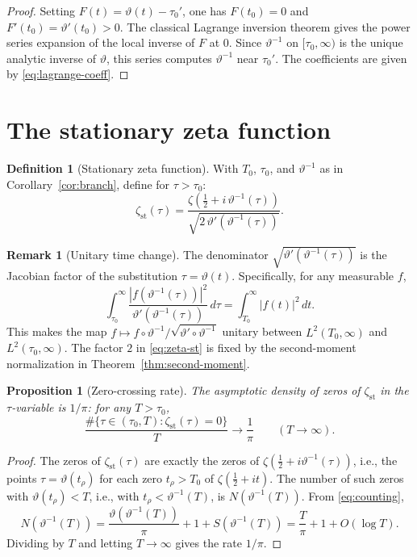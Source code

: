 \documentclass[11pt]{article}
\numberwithin{equation}{section}
\theoremstyle{plain}
\newtheorem{proposition}[theorem]{Proposition}
\theoremstyle{definition}
\newtheorem{definition}[theorem]{Definition}
\newtheorem{remark}[theorem]{Remark}
\begin{document}
\begin{proof}
Setting \(F(t)=\vartheta(t)-\tau_0'\), one has \(F(t_0)=0\) and
\(F'(t_0)=\vartheta'(t_0)>0\). The classical Lagrange inversion theorem gives the
power series expansion of the local inverse of \(F\) at \(0\). Since
\(\vartheta^{-1}\) on \([\tau_0,\infty)\) is the unique analytic inverse of \(\vartheta\),
this series computes \(\vartheta^{-1}\) near \(\tau_0'\). The coefficients are given
by \eqref{eq:lagrange-coeff}.
\end{proof}

\section{The stationary zeta function}

\begin{definition}[Stationary zeta function]
\label{def:zeta-st}
With \(T_0\), \(\tau_0\), and \(\vartheta^{-1}\) as in Corollary~\ref{cor:branch},
define for \(\tau>\tau_0\):
\begin{equation}
\zeta_{\mathrm{st}}(\tau)
=
\frac{
\zeta\!\left(\frac12+i\,\vartheta^{-1}(\tau)\right)
}{
\sqrt{2\,\vartheta'(\vartheta^{-1}(\tau))}
}.
\label{eq:zeta-st}
\end{equation}
\end{definition}

\begin{remark}[Unitary time change]
The denominator \(\sqrt{\vartheta'(\vartheta^{-1}(\tau))}\) is the Jacobian factor of
the substitution \(\tau=\vartheta(t)\). Specifically, for any measurable \(f\),
\[
\int_{\tau_0}^\infty
\frac{|f(\vartheta^{-1}(\tau))|^2}{\vartheta'(\vartheta^{-1}(\tau))}\,d\tau
=
\int_{T_0}^\infty |f(t)|^2\,dt.
\]
This makes the map \(f\mapsto f\circ\vartheta^{-1}/\sqrt{\vartheta'\circ\vartheta^{-1}}\)
unitary between \(L^2(T_0,\infty)\) and \(L^2(\tau_0,\infty)\). The factor \(2\) in
\eqref{eq:zeta-st} is fixed by the second-moment normalization in Theorem~\ref{thm:second-moment}.
\end{remark}

\begin{proposition}[Zero-crossing rate]
\label{prop:zeros}
The asymptotic density of zeros of \(\zeta_{\mathrm{st}}\) in the \(\tau\)-variable
is \(1/\pi\): for any \(T>\tau_0\),
\[
\frac{\#\{\tau\in(\tau_0,T):\zeta_{\mathrm{st}}(\tau)=0\}}{T}
\to
\frac{1}{\pi}
\qquad(T\to\infty).
\]
\end{proposition}

\begin{proof}
The zeros of \(\zeta_{\mathrm{st}}(\tau)\) are exactly the zeros of
\(\zeta(\frac12+i\vartheta^{-1}(\tau))\), i.e., the points
\(\tau=\vartheta(t_\rho)\) for each zero \(t_\rho>T_0\) of \(\zeta(\frac12+it)\).
The number of such zeros with \(\vartheta(t_\rho)<T\), i.e., with \(t_\rho<\vartheta^{-1}(T)\),
is \(N(\vartheta^{-1}(T))\). From \eqref{eq:counting},
\[
N(\vartheta^{-1}(T))
=
\frac{\vartheta(\vartheta^{-1}(T))}{\pi}+1+S(\vartheta^{-1}(T))
=
\frac{T}{\pi}+1+O(\log T).
\]
Dividing by \(T\) and letting \(T\to\infty\) gives the rate \(1/\pi\).
\end{proof}
\end{document}

